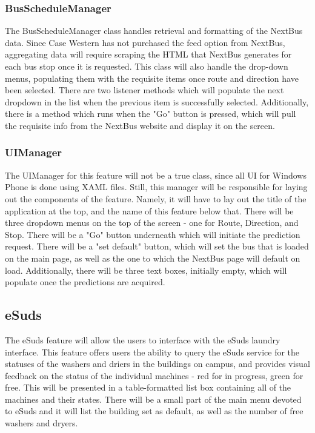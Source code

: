 \documentclass[pdftex,12pt,letter]{article}
\begin{document}
\subsubsection{BusScheduleManager}
The BusScheduleManager class handles retrieval and formatting of the NextBus data. Since Case Western has not purchased the feed option from NextBus, aggregating data will require scraping the HTML that NextBus generates for each bus stop once it is requested. This class will also handle the drop-down menus, populating them with the requisite items once route and direction have been selected. There are two listener methods which will populate the next dropdown in the list when the previous item is successfully selected. Additionally, there is a method which runs when the "Go" button is pressed, which will pull the requisite info from the NextBus website and display it on the screen.
\subsubsection{UIManager}
The UIManager for this feature will not be a true class, since all UI for Windows Phone is done using XAML files. Still, this manager will be responsible for laying out the components of the feature. Namely, it will have to lay out the title of the application at the top, and the name of this feature below that. There will be three dropdown menus on the top of the screen - one for Route, Direction, and Stop. There will be a "Go" button underneath which will initiate the prediction request. There will be a "set default" button, which will set the bus that is loaded on the main page, as well as the one to which the NextBus page will default on load. Additionally, there will be three text boxes, initially empty, which will populate once the predictions are acquired.
\subsection{eSuds}
The eSuds feature will allow the users to interface with the eSuds laundry interface. This feature offers users the ability to query the eSuds service for the statuses of the washers and driers in the buildings on campus, and provides visual feedback on the status of the individual machines - red for in progress, green for free. This will be presented in a table-formatted list box containing all of the machines and their states. There will be a small part of the main menu devoted to eSuds and it will list the building set as default, as well as the number of free washers and dryers.
\end{document}
